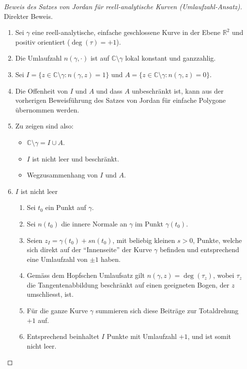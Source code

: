 \begin{proof}[Beweis des Satzes von Jordan für reell-analytische Kurven (Umlaufzahl-Ansatz)\label{jordan:proof:jordan_reell_analytische_kurven_umlaufzahl}]
    Direkter Beweis.

    \begin{enumerate}
        \item Sei $\gamma$ eine reell-analytische, einfache geschlossene Kurve in der Ebene $\mathbb{R}^2$ und positiv orientiert ($\deg(\tau) = +1$).
        \item Die Umlaufzahl $n(\gamma, \cdot)$ ist auf $\mathbb{C} \setminus \gamma$ lokal konstant und ganzzahlig.
        \item Sei $I = \{ z \in \mathbb{C} \setminus \gamma : n(\gamma, z) = 1 \}$ und $A = \{ z \in \mathbb{C} \setminus \gamma : n(\gamma, z) = 0 \}$.
        \item Die Offenheit von $I$ und $A$ und dass $A$ unbeschränkt ist, kann aus der vorherigen Beweisführung des Satzes von Jordan für einfache Polygone übernommen werden.
        \item Zu zeigen sind also: \begin{itemize}
            \item $\mathbb{C} \setminus \gamma = I \cup A$.
            \item $I$ ist nicht leer und beschränkt.
            \item Wegzusammenhang von $I$ und $A$.
        \end{itemize}
        \item $I$ ist nicht leer \begin{enumerate}
            \item Sei $t_0$ ein Punkt auf $\gamma$.
            \item Sei $n(t_0)$ die innere Normale an $\gamma$ im Punkt $\gamma(t_0)$.
            \item Seien $z_{I} = \gamma(t_0) + s n(t_0)$, mit beliebig kleinen $s > 0$, Punkte, welche sich direkt auf der ``Innenseite'' der Kurve $\gamma$ befinden und entsprechend eine Umlaufzahl von $\pm 1$ haben.
            \item Gemäss dem Hopfschen Umlaufsatz gilt $n(\gamma, z) = \deg(\tau_{z})$, wobei $\tau_{z}$ die Tangentenabbildung beschränkt auf einen geeigneten Bogen, der $z$ umschliesst, ist.
            \item Für die ganze Kurve $\gamma$ summieren sich diese Beiträge zur Totaldrehung $+1$ auf.
            \item Entsprechend beinhaltet $I$ Punkte mit Umlaufzahl $+1$, und ist somit nicht leer.

\end{enumerate}
\end{enumerate}
\end{proof}
